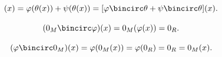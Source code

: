 \begin{defproof}
  \begin{equation*}
    [(\varphi + \psi) \bincirc \theta](x)
    =
    \varphi(\theta(x)) + \psi(\theta(x))
    =
    [\varphi \bincirc \theta + \psi \bincirc \theta](x).
  \end{equation*}

  \begin{equation*}
    (0_M \bincirc \varphi)(x)
    =
    0_M(\varphi(x))
    =
    0_R.
  \end{equation*}

  \begin{equation*}
    (\varphi \bincirc 0_M)(x)
    =
    \varphi(0_M(x))
    =
    \varphi(0_R)
    =
    0_R
    =
    0_M(x).
  \end{equation*}
\end{defproof}

